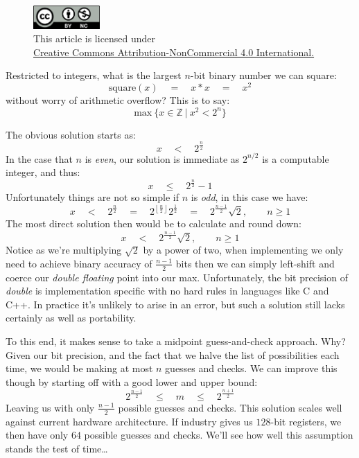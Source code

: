 \documentclass[twoside]{article}
\newcommand{\eq}{\ensuremath{\quad = \quad}}
\newcommand{\lt}{\ensuremath{\quad < \quad}}
\renewcommand{\leq}{\ensuremath{\quad\le\quad}}
\begin{document}
\begin{figure}[h]
\centering
\includegraphics[width=1in]{cc-by-nc.png}\\[0.1in]
\tiny This article is licensed under \\
\href{http://creativecommons.org/licenses/by-nc/4.0/}
{Creative Commons Attribution-NonCommercial 4.0 International.}\\[0.3in]
\end{figure}

Restricted to integers, what is the largest $ n $-bit binary number we can square:
$$ \mbox{square}(x)\quad =\quad x*x\quad =\quad x^2 $$
without worry of arithmetic overflow? This is to say:
$$ \mbox{max}\ \{ x\in\mathbb{Z}\ |\ x^2 < 2^n \} $$

The obvious solution starts as:
$$ x \lt 2^{\frac{n}{2}} $$
In the case that $ n $ is \emph{even}, our solution is immediate as $ 2^{n/2} $ is a computable integer, and thus:
$$ x \leq 2^{\frac{n}{2}}-1 $$
Unfortunately things are not so simple if $ n $ is \emph{odd}, in this case we have:
$$ x\lt 2^\frac{n}{2} \eq 2^{\left\lfloor\frac{n}{2}\right\rfloor}2^\frac{1}{2} \eq 2^\frac{n-1}{2}\sqrt{2},\qquad n\ge 1 $$
The most direct solution then would be to calculate and round down:
$$ x\lt 2^\frac{n-1}{2}\sqrt{2},\qquad n\ge 1 $$
Notice as we're multiplying $ \sqrt{2} $ by a power of two, when implementing we only need to achieve binary accuracy
of $ \frac{n-1}{2} $ bits then we can simply left-shift and coerce our \emph{double floating} point into our max.
Unfortunately, the bit precision of \emph{double} is implementation specific with no hard rules in languages like C and C++.
In practice it's unlikely to arise in an error, but such a solution still lacks certainly as well as portability.

To this end, it makes sense to take a midpoint guess-and-check approach. Why? Given our bit precision, and the fact that
we halve the list of possibilities each time, we would be making at most $ n $ guesses and checks. We can improve this
though by starting off with a good lower and upper bound:
$$ 2^\frac{n-1}{2} \leq m \leq 2^\frac{n+1}{2} $$
Leaving us with only $ \frac{n-1}{2} $ possible guesses and checks. This solution scales well against current hardware
architecture. If industry gives us $ 128 $-bit registers, we then have only $ 64 $ possible guesses and checks.
We'll see how well this assumption stands the test of time\ldots
\end{document}
